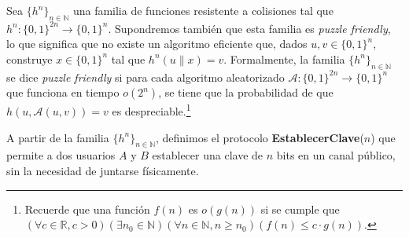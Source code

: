 
Sea $\{h^n\}_{n \in \mathbb{N}}$ una familia de funciones resistente a colisiones tal que $h^n : \{0,1\}^{2n} \to \{0,1\}^{n}$. Supondremos también que esta familia es \textit{puzzle friendly}, lo que significa que no existe un algoritmo eficiente que, dados $u, v \in \{0,1\}^n$, construye $x \in \{0,1\}^n$ tal que $h^n(u \| x) = v$. Formalmente, la familia $\{h^n\}_{n \in \mathbb{N}}$ se dice \textit{puzzle
friendly} si para cada algoritmo aleatorizado $\mathcal{A}:\{0,1\}^{2n} \to \{0,1\}^{n}$ que
funciona en tiempo $o(2^n)$, se tiene que la probabilidad de que $h(u, \mathcal{A}(u,v))=v$ es despreciable.\footnote{Recuerde que una función $f(n)$ es $o(g(n))$ si se cumple que $(\forall c \in \mathbb{R}, c > 0)(\exists n_0 \in \mathbb{N})(\forall n \in \mathbb{N}, n \geq n_0)(f(n) \leq c \cdot g(n))$.}

A partir de la familia $\{h^n\}_{n \in \mathbb{N}}$, definimos el
protocolo {\bf EstablecerClave}($n$) que permite a dos usuarios $A$ y $B$
establecer una clave de $n$ bits en un canal público, sin la necesidad de juntarse físicamente.

